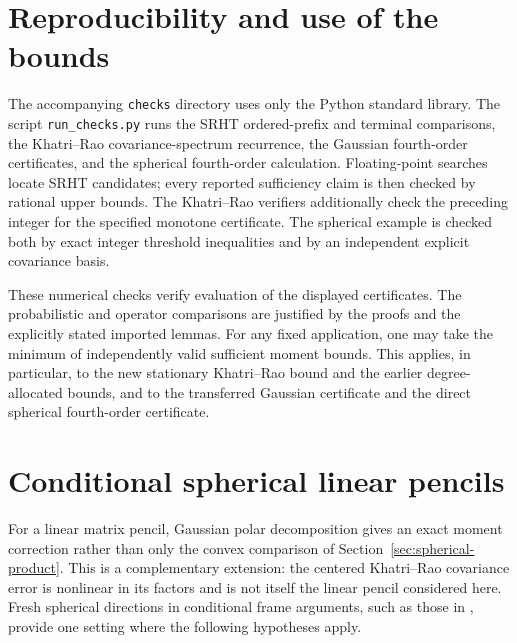 \documentclass[11pt,a4paper]{article}
\theoremstyle{definition}\newtheorem{definition}[theorem]{Definition}
\theoremstyle{remark}\newtheorem{remark}[theorem]{Remark}
\numberwithin{equation}{section}
\begin{document}
\section{Reproducibility and use of the bounds}
The accompanying \texttt{checks} directory uses only the Python standard
library. The script \texttt{run\_checks.py} runs the SRHT ordered-prefix and
terminal comparisons, the Khatri--Rao covariance-spectrum recurrence,
the Gaussian fourth-order certificates, and the spherical fourth-order
calculation. Floating-point searches locate SRHT candidates; every reported
sufficiency claim is then checked by rational upper bounds. The
Khatri--Rao verifiers additionally check the preceding integer for the
specified monotone certificate. The spherical example is checked both
by exact integer threshold inequalities and by an independent explicit
covariance basis.

These numerical checks verify evaluation of the displayed certificates.
The probabilistic and operator comparisons are justified by the proofs
and the explicitly stated imported lemmas. For any fixed application,
one may take the minimum of independently valid sufficient moment bounds.
This applies, in particular, to the new stationary Khatri--Rao bound and
the earlier degree-allocated bounds, and to the transferred Gaussian
certificate and the direct spherical fourth-order certificate.

\appendix


\section{Conditional spherical linear pencils}
\label{sec:conditional-spherical}

For a linear matrix pencil, Gaussian polar decomposition gives an exact
moment correction rather than only the convex comparison of
Section~\ref{sec:spherical-product}.  This is a complementary extension:
the centered Khatri--Rao covariance error is nonlinear in its factors and
is not itself the linear pencil considered here.  Fresh spherical
directions in conditional frame arguments, such as those in
\cite{HSSSource}, provide one setting where the following hypotheses apply.
\end{document}
